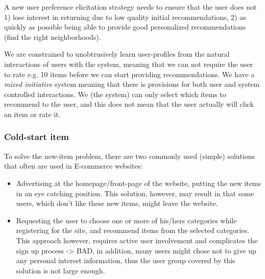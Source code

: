 A new user preference elicitation strategy needs to ensure that the user does not 1) lose interest in returning due to low quality initial recommendations, 2) as quickly as possible being able to provide good personalized recommendations (find the right neighborhoods).

We are constrained to unobtrusively learn user-profiles from the natural interactions of users with the system, meaning that we can not require the user to rate e.g. 10 items before we can start providing recommendations. We have a \emph{mixed initiative} system meaning that there is provisions for both user and system controlled interactions. We (the system) can only select which items to recommend to the user, and this does not mean that the user actually will click an item or rate it.


\subsubsection{Cold-start item}

To solve the new-item problem, there are two commonly used (simple) solutions that often are used in E-commerce websites:

\begin{itemize}
\item Advertising at the homepage/front-page of the website, putting the new items in an eye catching position. This solution, however, may 		result in that some users, which don't like these new items, might leave the website.
\item Requesting the user to choose one or more of his/hers categories while registering for the site, and recommend items from the selected categories. This approach however, requires active user involvement and complicates the sign up process -> BAD, in addition, many users might chose not to give up any personal interest information, thus the user group covered by this solution is not large enough.
\end{itemize}





